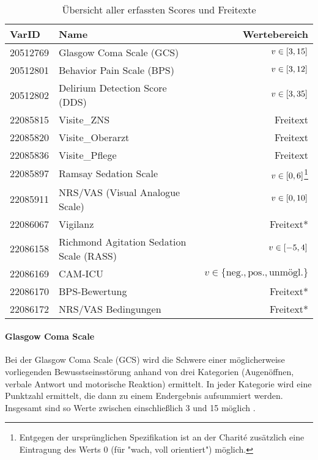 \begin{table}[htb] %
    \centering
    \begin{tabular}{llr}\toprule
        \textbf{VarID}	&\textbf{Name} &\textbf{Wertebereich} \\\midrule
        20512769    & Glasgow Coma Scale (GCS)          & $v \in \interval{3}{15}$ \\
        20512801    & Behavior Pain Scale (BPS)         & $v \in \interval{3}{12}$ \\
        20512802    & Delirium Detection Score (DDS)    & $v \in \interval{3}{35}$ \\
        22085815    & Visite\_ZNS                        & Freitext \\
        22085820    & Visite\_Oberarzt                   & Freitext \\
        22085836    & Visite\_Pflege                     & Freitext \\
        22085897    & Ramsay Sedation Scale             & $v \in \interval{0}{6}$\footnote{Entgegen der ursprünglichen Spezifikation ist an der Charité zusätzlich eine Eintragung des Werts $0$ (für "wach, voll orientiert") möglich.} \\
        22085911    & NRS/VAS (Visual Analogue Scale)   & $v \in \interval{0}{10}$ \\
        22086067    & Vigilanz                          & Freitext* \\
        22086158    & Richmond Agitation Sedation Scale (RASS) & $v \in \interval{-5}{4}$ \\
        22086169    & CAM-ICU                           & $v \in \{	\text{neg.}, \text{pos.}, \text{unmögl.} \}$ \\
        22086170    & BPS-Bewertung                     & Freitext* \\
        22086172    & NRS/VAS Bedingungen               & Freitext* \\\bottomrule
    \end{tabular}

    \caption{Übersicht aller erfassten Scores und Freitexte}
    \label{table:varids}
\end{table}

\paragraph{Glasgow Coma Scale}
Bei der Glasgow Coma Scale (GCS) wird die Schwere einer möglicherweise vorliegenden Bewusstseinsstörung anhand von drei Kategorien (Augenöffnen, verbale Antwort und motorische Reaktion) ermittelt. In jeder Kategorie wird eine Punktzahl ermittelt, die dann zu einem Endergebnis aufsummiert werden. Insgesamt sind so Werte zwischen einschließlich 3 und 15 möglich \citep{teasdaleAssessmentComaImpaired1974,marxIntensivmedizin2015c}.

